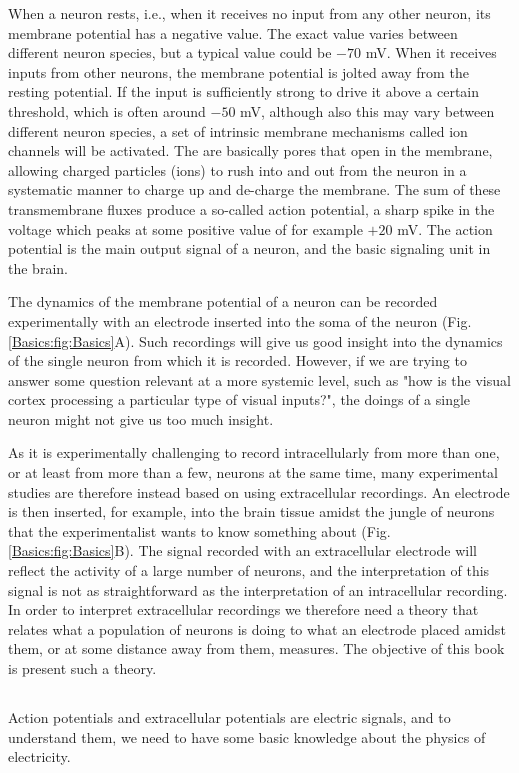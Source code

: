 When a neuron rests, i.e., when it receives no input from any other neuron, its membrane potential has a negative value. The exact value varies between different neuron species, but a typical value could be $-70$ mV. When it receives inputs from other neurons, the membrane potential is jolted away from the resting potential. If the input is sufficiently strong to drive it above a certain threshold, which is often around $-50$ mV, although also this may vary between different neuron species, a set of intrinsic membrane mechanisms called ion channels will be activated. The are basically pores that open in the membrane, allowing charged particles (ions) to rush into and out from the neuron in a systematic manner to charge up and de-charge the membrane. 
The sum of these transmembrane fluxes produce a so-called action potential, a sharp spike in the voltage which peaks at some positive value of for example $+20$ mV. The action potential is the main output signal of a neuron, and the basic signaling unit in the brain.

The dynamics of the membrane potential of a neuron can be recorded experimentally with an electrode inserted into the soma of the neuron (Fig. \ref{Basics:fig:Basics}A). Such recordings will give us good insight into the dynamics of the single neuron from which it is recorded. However, if we are trying to answer some question relevant at a more systemic level, such as "how is the visual cortex processing a particular type of visual inputs?", the doings of a single neuron might not give us too much insight. 

As it is experimentally challenging to record intracellularly from more than one, or at least from more than a few, neurons at the same time, many experimental studies are therefore instead based on using extracellular recordings. An electrode is then inserted, for example, into the brain tissue amidst the jungle of neurons that the experimentalist wants to know something about (Fig. \ref{Basics:fig:Basics}B). The signal recorded with an extracellular electrode will reflect the activity of a large number of neurons, and the interpretation of this signal is not as straightforward as the interpretation of an intracellular recording. In order to interpret extracellular recordings we therefore need a theory that relates what a population of neurons is doing to what an electrode placed amidst them, or at some distance away from them, measures. The objective of this book is present such a theory.


\subsection{}
Action potentials and extracellular potentials are electric signals, and to understand them, we need to have some basic knowledge about the physics of electricity. 

